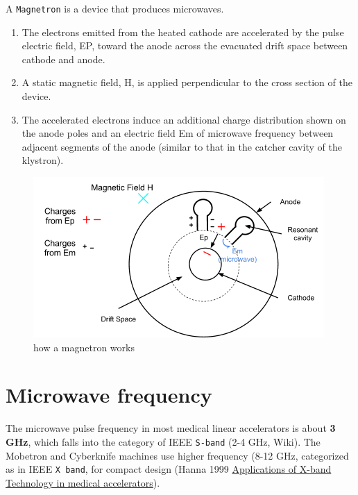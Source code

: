 \documentclass[]{book}
\providecommand{\tightlist}{%
  \setlength{\itemsep}{0pt}\setlength{\parskip}{0pt}}
\theoremstyle{definition}
\theoremstyle{definition}
\theoremstyle{definition}
\theoremstyle{remark}
\begin{document}
A \texttt{Magnetron} is a device that produces microwaves.

\begin{enumerate}
\def\labelenumi{\arabic{enumi}.}
\tightlist
\item
  The electrons emitted from the heated cathode are accelerated by the
  pulse electric field, EP, toward the anode across the evacuated drift
  space between cathode and anode.
\item
  A static magnetic field, H, is applied perpendicular to the cross
  section of the device.
\item
  The accelerated electrons induce an additional charge distribution
  shown on the anode poles and an electric field Em of microwave
  frequency between adjacent segments of the anode (similar to that in
  the catcher cavity of the klystron).
\end{enumerate}

\begin{figure}

{\centering \includegraphics{figures/magnetron} 

}

\caption{how a magnetron works}\label{fig:unnamed-chunk-5}
\end{figure}

\section{Microwave frequency}\label{microwave-frequency}

The microwave pulse frequency in most medical linear accelerators is
about \textbf{3 GHz}, which falls into the category of IEEE
\texttt{S-band} (2-4 GHz, Wiki). The Mobetron and Cyberknife machines
use higher frequency (8-12 GHz, categorized as in IEEE \texttt{X\ band},
for compact design (Hanna 1999
\href{https://accelconf.web.cern.ch/AccelConf/p99/PAPERS/WEP114.PDF}{Applications
of X-band Technology in medical accelerators}).
\end{document}
